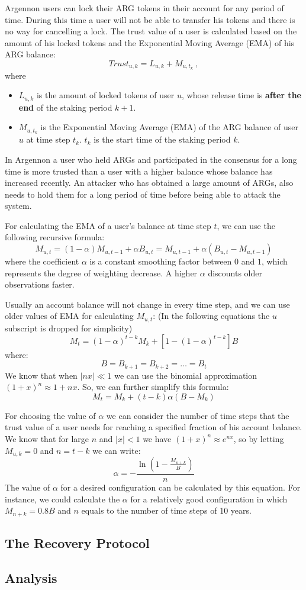 Argennon users can lock their ARG tokens in their account for any period of time. During this time a user
will not be able to transfer his tokens and there is no way for cancelling a lock.
The trust value of a user is calculated based on the amount of his locked tokens and the
Exponential Moving Average (EMA) of his ARG balance:
\[
    Trust_{u,k} = L_{u,k} + M_{u,t_k}\ ,
\]
where
\begin{itemize}
    \item $L_{u,k}$ is the amount of locked tokens of user $u$, whose release time is \textbf{after the end} of
    the staking period $k+1$.
    \item $M_{u,t_k}$ is the Exponential Moving Average (EMA) of the ARG balance of user \(u\) at time step \(t_k\).
    $t_k$ is the start time of the staking period $k$.
\end{itemize}

In Argennon a user who held ARGs and participated in the consensus for a long time is more trusted
than a user with a higher balance whose balance has increased recently. An attacker who has obtained a large
amount of ARGs, also needs to hold them for a long period of time before being able to attack the system.

For calculating the EMA of a user's balance at time step \(t\), we can use the following
recursive formula:
\[
    M_{u,t} = (1 - \alpha) M_{u,t-1} + \alpha B_{u,t} = M_{u,t-1} + \alpha (B_{u,t} - M_{u,t-1})
\]
where the coefficient \(\alpha\) is a constant smoothing factor between \(0\) and \(1\), which represents the
degree of weighting decrease. A higher \(\alpha\) discounts older observations faster.

Usually an account balance will not change in every time step, and we can use older values of EMA for calculating
\(M_{u,t}\): (In the following equations the \(u\) subscript is dropped for simplicity)
\[
    M_{t} = (1 - \alpha)^{t-k}M_{k} + [1 - (1 - \alpha)^{t - k}]B
\]
where:
\[
    B = B_{k+1} = B_{k+2} = \dots = B_{t}
\]
We know that when \(|nx| \ll 1\) we can use the binomial approximation \({(1 + x)^n \approx 1 + nx}\). So, we can
further simplify this formula:
\[
    M_{t} = M_{k} + (t - k) \alpha (B - M_{k})
\]

For choosing the value of \(\alpha\) we can consider the number of time steps that the trust value of a user needs
for reaching a specified fraction of his account balance. We know that for large \(n\) and \(|x| < 1\) we have
\((1 + x)^n \approx e^{nx}\), so by letting \(M_{u,k} = 0\) and \(n = t - k\) we can write:
\[
    \alpha =- \frac{\ln\left(1 - \frac{M_{n+k}}{B}\right)}{n}
\]
The value of \(\alpha\) for a desired configuration can be calculated by this equation. For instance, we could
calculate the \(\alpha\) for a relatively good configuration in which \(M_{n+k} = 0.8B\) and \(n\) equals to the
number of time steps of 10 years.


\subsection{The Recovery Protocol}\label{subsec:recovery}

\subsection{Analysis}\label{subsec:consensus-math}
